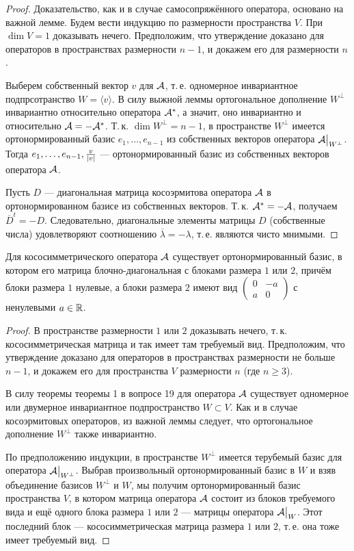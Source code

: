 \begin{proof}
    Доказательство, как и в случае самосопряжённого оператора, основано на важной лемме. Будем вести индукцию по размерности пространства $V$. При $\dim V = 1$ доказывать нечего. Предположим, что утверждение доказано для операторов в пространствах размерности $n - 1$, и докажем его для размерности $n$.

    Выберем собственный вектор $v$ для $\mathcal{A}$, т.\,е. одномерное инвариантное подпрсотранство $W = \langle v\rangle$. В силу выжной леммы ортогональное дополнение $W^\perp$ инвариантно относительно оператора $\mathcal{A}^\ast$, а значит, оно инвариантно и относительно $\mathcal{A} = -\mathcal{A}^\ast$. Т.\,к. $\dim W^\perp = n - 1$, в пространстве $W^\perp$ имеется ортонормированный базис $e_1, \ldots, e_{n - 1}$ из собственных векторов оператора $\mathcal{A}\big|_{W^\perp}$. Тогда $e_1, \ldots, e_{n - 1}, \frac{v}{\left\lvert v\right\rvert}$ --- ортонормированный базис из собственных векторов оператора $\mathcal{A}$.

    Пусть $D$ --- диагональная матрица косоэрмитова оператора $\mathcal{A}$ в ортонормированном базисе из собственных векторов. Т.\,к. $\mathcal{A}^\ast = -\mathcal{A}$, получаем $\overline{D}^t = -D$. Следовательно, диагональные элементы матрицы $D$ (собственные числа) удовлетворяют соотношению $\overline{\lambda} = -\lambda$, т.\,е. являются чисто мнимыми.
\end{proof}

\begin{theorem}
    Для кососимметрического оператора $\mathcal{A}$ существует ортонормированный базис, в котором его матрица блочно-диагональная с блоками размера $1$ или $2$, причём блоки размера $1$ нулевые, а блоки размера $2$ имеют вид
    $
    \begin{pmatrix}
        0 & -a\\
        a & 0
    \end{pmatrix}
    $ с ненулевыми $a \in \mathbb{R}$.
\end{theorem}

\begin{proof}
    В пространстве размерности $1$ или $2$ доказывать нечего, т.\,к. кососимметрическая матрица и так имеет там требуемый вид. Предположим, что утверждение доказано для операторов в пространствах размерности не больше $n - 1$, и докажем его для пространства $V$ размерности $n$ (где $n \geqslant 3$).

    В силу теоремы теоремы 1 в вопросе 19 для оператора $\mathcal{A}$ существует одномерное или двумерное инвариантное подпространство $W \subset V$. Как и в случае косоэрмитовых операторов, из важной леммы следует, что ортогональное дополнение $W^\perp$ также инвариантно.

    По предположению индукции, в пространстве $W^\perp$ имеется терубемый базис для оператора $\mathcal{A}\big|_{W^\perp}$. Выбрав произвольный ортонормированный базис в $W$ и взяв объединение базисов $W^\perp$ и $W$, мы получим ортонормированный базис пространства $V$, в котором матрица оператора $\mathcal{A}$ состоит из блоков требуемого вида и ещё одного блока размера $1$ или $2$ --- матрицы оператора $\mathcal{A}\big|_W$. Этот последний блок --- кососимметрическая матрица размера $1$ или $2$, т.\,е. она тоже имеет требуемый вид.
\end{proof}

